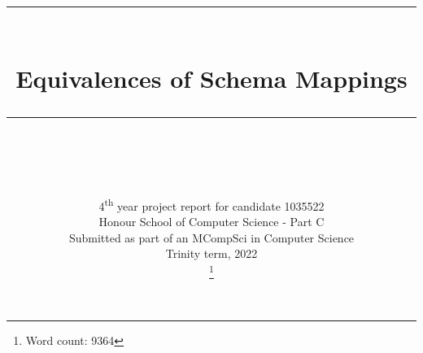 \documentclass[11pt, a4paper, dvipsnames]{article}
\newcommand\blankpage{
    \null
    \thispagestyle{empty}%
    \addtocounter{page}{-1}%
    \newpage}
\newcommand{\HRule}[1]{\rule{\linewidth}{#1}}
\begin{document}
\title{ \normalsize \textsc{}
		\\ [2.0cm]
		\HRule{0.5pt} \\
		\LARGE \textbf{Equivalences of Schema Mappings}
		\HRule{0.5pt} \\ [0.5cm]
		\normalsize  \vspace*{3\baselineskip}}
\date{}
\author{
		4\textsuperscript{th} year project report for candidate 1035522\\
        Honour School of Computer Science - Part C\\
        Submitted as part of an MCompSci in Computer Science\\
		Trinity term, 2022\\ \footnote{Word count: 9364}	
		}

\maketitle
\thispagestyle{empty}
\newpage
\blankpage

\setcounter{page}{3}

\justifying
\end{document}
